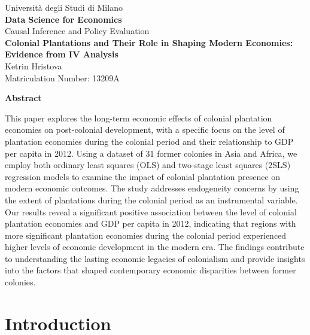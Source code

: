 \documentclass[12pt]{article}
\begin{document}
\begin{titlepage}
    \centering
    \vspace*{1.5in}
    
    \Huge
    Università degli Studi di Milano \\
    \vspace{0.5in}
    \LARGE
    \textbf{Data Science for Economics} \\
    \vspace{0.5in}
    \Large
    Causal Inference and Policy Evaluation \\
    \vspace{1.5in}
    \Huge
    \textbf{Colonial Plantations and Their Role in Shaping Modern Economies: Evidence from IV Analysis} \\
    \vfill
    {\Large Ketrin Hristova} \\
    \normalsize Matriculation Number: 13209A \\
    \vspace{0.5in}
    
\end{titlepage}

\newpage
\begin{center}
    \textbf{Abstract}
\end{center}

\noindent
This paper explores the long-term economic effects of colonial plantation economies on post-colonial development, with a specific focus on the level of plantation economies during the colonial period and their relationship to GDP per capita in 2012. Using a dataset of 31 former colonies in Asia and Africa, we employ both ordinary least squares (OLS) and two-stage least squares (2SLS) regression models to examine the impact of colonial plantation presence on modern economic outcomes. The study addresses endogeneity concerns by using the extent of plantations during the colonial period as an instrumental variable. Our results reveal a significant positive association between the level of colonial plantation economies and GDP per capita in 2012, indicating that regions with more significant plantation economies during the colonial period experienced higher levels of economic development in the modern era. The findings contribute to understanding the lasting economic legacies of colonialism and provide insights into the factors that shaped contemporary economic disparities between former colonies.
\newpage
\section{Introduction}
\end{document}
